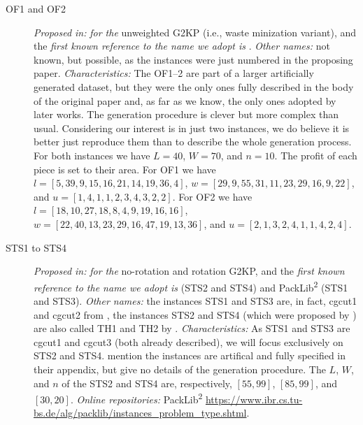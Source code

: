 \documentclass[ppgc,tese,english,formais,babel]{iiufrgs}
\begin{document}
\begin{description}
\item [OF1 and OF2] \emph{Proposed in:} \citet{oliveira:1990} \emph{for the} unweighted G2KP (i.e., waste minization variant), and the \emph{first known reference to the name we adopt is} \citet{hifi:2001}. \emph{Other names:} not known, but possible, as the instances were just numbered in the proposing paper. \emph{Characteristics: } The OF1--2 are part of a larger artificially generated dataset, but they were the only ones fully described in the body of the original paper and, as far as we know, the only ones adopted by later works. The generation procedure is clever but more complex than usual. Considering our interest is in just two instances, we do believe it is better just reproduce them than to describe the whole generation process. For both instances we have \(L = 40\), \(W = 70\), and \(n = 10\). The profit of each piece is set to their area. For OF1 we have \(l = [5, 39, 9, 15, 16, 21, 14, 19, 36, 4]\), \(w = [29, 9, 55, 31, 11, 23, 29, 16, 9, 22]\), and \(u = [1, 4, 1, 1, 2, 3, 4, 3, 2, 2]\). For OF2 we have \(l = [18, 10, 27, 18, 8, 4, 9, 19, 16, 16]\), \(w = [22, 40, 13, 23, 29, 16, 47, 19, 13, 36]\), and \(u = [2, 1, 3, 2, 4, 1, 1, 4, 2, 4]\).
\item [STS1 to STS4] \emph{Proposed in:} \citet{tschoke:1995} \emph{for the} no-rotation and rotation G2KP, and the \emph{first known reference to the name we adopt is} \citet{alvarez:2002:tabu} (STS2 and STS4) and PackLib\textsuperscript{2} (STS1 and STS3). \emph{Other names:} the instances STS1 and STS3 are, in fact, cgcut1 and cgcut2 from \citet{cw:1977}, the instances STS2 and STS4 (which were proposed by \citet{tschoke:1995}) are also called TH1 and TH2 by \citet{fayard:1998}. \emph{Characteristics: } As STS1 and STS3 are cgcut1 and cgcut3 (both already described), we will focus exclusively on STS2 and STS4. \citet{tschoke:1995} mention the instances are artifical and fully specified in their appendix, but give no details of the generation procedure. The \(L\), \(W\), and \(n\) of the STS2 and STS4 are, respectively, \([55, 99]\), \([85, 99]\), and \([30, 20]\). \emph{Online repositories:} PackLib\textsuperscript{2} \url{https://www.ibr.cs.tu-bs.de/alg/packlib/instances_problem_type.shtml}.

\end{description}
\end{document}
